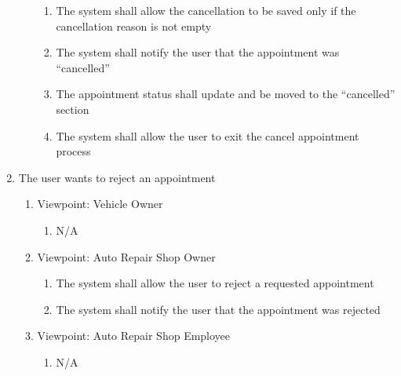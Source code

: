 \documentclass[12pt]{article}
\begin{document}
\begin{enumerate}[resume*=business_events]
\begin{enumerate}[VP\arabic*.]
\begin{enumerate}
			            \item The system shall allow the cancellation to be saved only if the cancellation reason is not empty
			            \item The system shall notify the user that the appointment was ``cancelled''
			            \item The appointment status shall update and be moved to the ``cancelled'' section
			            \item The system shall allow the user to exit the cancel appointment process
		            \end{enumerate}
	      \end{enumerate}

	\item The user wants to reject an appointment
	      \begin{enumerate}[VP\arabic*.]
		      \item Viewpoint: Vehicle Owner
		            \begin{enumerate}
			            \item[] N/A
		            \end{enumerate}
		      \item Viewpoint: Auto Repair Shop Owner
		            \begin{enumerate}
			            \item The system shall allow the user to reject a requested appointment
			            \item The system shall notify the user that the appointment was rejected
		            \end{enumerate}
		      \item Viewpoint: Auto Repair Shop Employee
		            \begin{enumerate}
			            \item[] N/A
		            \end{enumerate}
	      \end{enumerate}


\end{enumerate}
\end{document}

